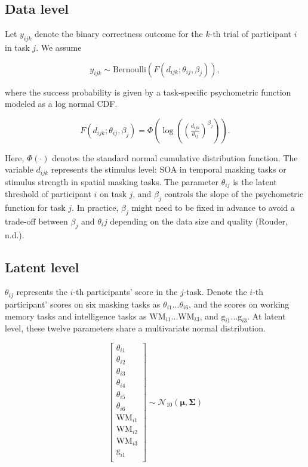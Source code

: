 \documentclass[
  ,man]{apa6}
\begin{document}
\subsection{Data level}\label{data-level}

Let \(y_{ijk}\) denote the binary correctness outcome for the \(k\)-th trial of participant \(i\) in task \(j\). We assume

\[
y_{ijk} \sim \text{Bernoulli}\!\left(F(d_{ijk}; \theta_{ij}, \beta_{j})\right),
\]

where the success probability is given by a task-specific psychometric function modeled as a log normal CDF.

\[
F(d_{ijk}; \theta_{ij}, \beta_{j}) = \Phi\!\left( \log \left( \left(\tfrac{d_{ijk}}{\theta_{ij}}\right)^{\beta_j} \right) \right).
\]

Here, \(\Phi(\cdot)\) denotes the standard normal cumulative distribution function. The variable \(d_{ijk}\) represents the stimulus level: SOA in temporal masking tasks or stimulus strength in spatial masking tasks. The parameter \(\theta_{ij}\) is the latent threshold of participant \(i\) on task \(j\), and \(\beta_j\) controls the slope of the psychometric function for task \(j\). In practice, \(\beta_j\) might need to be fixed in advance to avoid a trade-off between \(\beta_j\) and \(\theta_ij\) depending on the data size and quality (Rouder, n.d.).

\subsection{Latent level}\label{latent-level}

\(\theta_{ij}\) represents the \(i\)-th participants' score in the \(j\)-task. Denote the \(i\)-th participant' scores on six masking tasks as \(\theta_{i1} ... \theta_{i6}\), and the scores on working memory tasks and intelligence tasks as \(\text{WM}_{i1} ... \text{WM}_{i3}\), and \(\text{g}_{i1} ... \text{g}_{i3}\). At latent level, these twelve parameters share a multivariate normal distribution.

\[
\begin{bmatrix}
\theta_{i1} \\
\theta_{i2} \\
\theta_{i3} \\
\theta_{i4} \\
\theta_{i5} \\
\theta_{i6} \\
\text{WM}_{i1} \\
\text{WM}_{i2} \\
\text{WM}_{i3} \\
\text{g}_{i1} \\
\end{bmatrix}
\sim \mathcal{N}_{10}(\boldsymbol{\mu}, \boldsymbol{\Sigma})
\]
\end{document}
